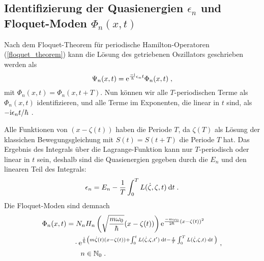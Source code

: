     \subsection{\texorpdfstring{Identifizierung der Quasienergien $\epsilon_n$ und Floquet-Moden $\Phi_n(x,t)$}{Identifizierung der Quasienergien \epsilon_n und Floquet-Moden \Phi_n(x,t)}}
      Nach dem Floquet-Theorem für periodische Hamilton-Operatoren (\ref{floquet_theorem}) kann die Lösung des getriebenen Oszillators geschrieben werden als
      \begin{equation}
        \Psi_n(x,t) = \text e^{\frac{-\text i}{\hbar}\epsilon_nt}\Phi_n(x,t) \; ,
      \end{equation}
      mit $\Phi_n(x,t)=\Phi_n(x,t+T)$.
      Nun können wir alle $T$-periodischen Terme als $\Phi_n(x,t)$ identifizieren, und alle Terme im Exponenten, die linear in $t$ sind, als $-\text i\epsilon_n t/\hbar$ \cite{haenggi}.

      Alle Funktionen von $(x-\zeta(t))$ haben die Periode $T$, da $\zeta(T)$ als Lösung der klassichen Bewegungsgleichung mit $S(t)=S(t+T)$ die Periode $T$ hat. Das
      Ergebnis des Integrals über die Lagrange-Funktion kann nur $T$-periodisch oder linear in $t$ sein, deshalb sind die Quasienergien gegeben durch die $E_n$ und den linearen Teil des Integrals:
      \begin{equation}
        \epsilon_n = E_n - \frac{1}{T} \int_0^T L(\dot \zeta, \zeta, t) \: \text d t \; .
      \end{equation}
      Die Floquet-Moden sind demnach
      \begin{align}
        \begin{split}
          \Phi_n(x,t) &=
           N_nH_n\left(\sqrt{\frac{m\omega_0}{\hbar}}(x-\zeta(t))\right) \text e^{\frac{-m\omega_0}{2\hbar}(x-\zeta(t))^2} \\
          &\quad \cdot \text e^{\frac{\text i}{\hbar}\left(m\dot \zeta(t)(x-\zeta(t))+\int_0^tL(\dot \zeta,\zeta,t')\:\text d t-\frac{t}{T} \int_0^T L(\dot \zeta,\zeta,t)\:\text dt\: \right)} \; , \\
          &\quad \quad n \in \mathbb{N}_0 \; .
        \end{split}
      \end{align}


